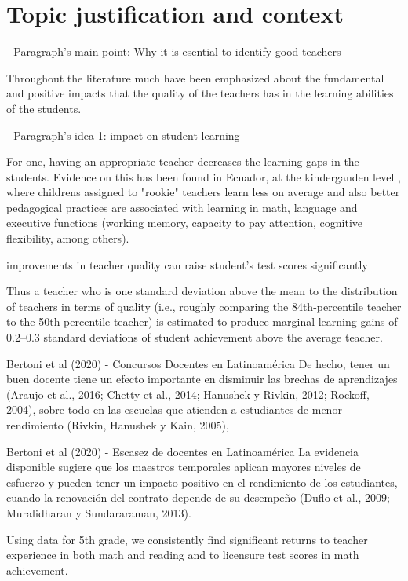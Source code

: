 \section{Topic justification and context}

- Paragraph's main point: Why it is esential to identify good teachers

Throughout the literature much have been emphasized about the fundamental and positive impacts that the quality of the teachers has in the learning abilities of the students.

- Paragraph's idea 1: impact on student learning
  
For one, having an appropriate teacher decreases the learning gaps in the students. Evidence on this has been found in Ecuador, at the kinderganden level \citep{Araujo_et_al_2016}, where childrens assigned to "rookie" teachers learn less on average and also better pedagogical practices are associated with learning in math, language and executive functions (working memory, capacity to pay attention, cognitive flexibility, among others).

improvements in teacher quality can raise student's test scores significantly \citep{Chetty_et_al_2014a}


Thus a teacher who is one standard deviation above the mean to the distribution of teachers in terms of quality (i.e., roughly comparing the 84th-percentile teacher to the 50th-percentile teacher) is estimated to produce marginal learning gains of 0.2–0.3 standard deviations of student achievement above the average teacher. \citep{Hanushek_et_al_2012}


Bertoni et al (2020) - Concursos Docentes en Latinoamérica
De hecho, tener un buen docente tiene un efecto importante en disminuir las brechas de aprendizajes (Araujo et al., 2016; Chetty et al., 2014; Hanushek y Rivkin, 2012; Rockoff, 2004), sobre todo en las escuelas que atienden a estudiantes de menor rendimiento (Rivkin, Hanushek y Kain, 2005),

Bertoni et al (2020) - Escasez de docentes en Latinoamérica
La evidencia disponible sugiere que los maestros temporales aplican mayores niveles de esfuerzo y pueden tener un impacto positivo en el rendimiento de los estudiantes, cuando la renovación del contrato depende de su desempeño (Duflo et al., 2009; Muralidharan y Sundararaman, 2013).


Using data for 5th grade, we consistently find significant returns to teacher experience in both math and reading and to licensure test scores in math achievement. \citep{Hanushek_et_al_2012}



